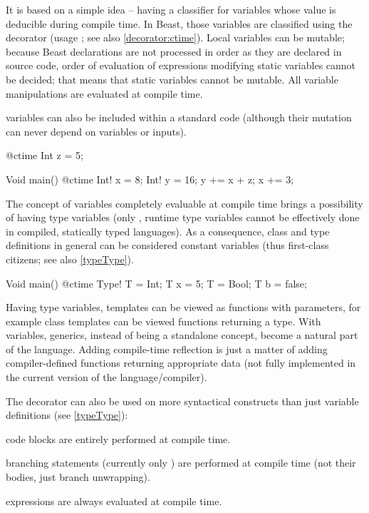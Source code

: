 It is based on a simple idea -- having a classifier for variables whose value is deducible during compile time. In Beast, those variables are classified using the  decorator (usage ; see also \autoref{decorator:ctime}). Local \ctime variables can be mutable; because Beast declarations are not processed in order as they are declared in source code, order of evaluation of expressions modifying static \ctime variables cannot be decided; that means that static \ctime variables cannot be mutable. All \ctime variable manipulations are evaluated at compile time.

\ctime variables can also be included within a standard code (although their mutation can never depend on \nonctime variables or inputs).

\begin{code}
@ctime Int z = 5;

Void main() {
	@ctime Int! x = 8;
	Int! y = 16;
	y += x + z;
	x += 3;
}
\end{code}

The concept of variables completely evaluable at compile time brings a possibility of having type variables (only \ctime, runtime type variables cannot be effectively done in compiled, statically typed languages). As a consequence, class and type definitions in general can be considered \ctime constant variables (thus first-class citizens; see also \autoref{typeType}).

\begin{code}
Void main() {
	@ctime Type! T = Int;
	T x = 5;
	T = Bool;
	T b = false;
}
\end{code}

Having type variables, templates can be viewed as functions with \ctime parameters, for example class templates can be viewed functions returning a type. With \ctime variables, generics, instead of being a standalone concept, become a natural part of the language. Adding compile-time reflection is just a matter of adding compiler-defined functions returning appropriate \ctime data (not fully implemented in the current version of the language/compiler).

The  decorator can also be used on more syntactical constructs than just variable definitions (see \autoref{typeType}):
\begin{compactitem}
	\item \ctime code blocks are entirely performed at compile time.
	\item \ctime branching statements (currently only ) are performed at compile time (not their bodies, just branch unwrapping).
	\item \ctime expressions are always evaluated at compile time.
\end{compactitem}

